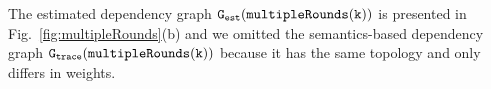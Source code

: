 The estimated dependency graph $\mathtt{{G_{est}}}(\mathtt{multipleRounds(k)})$ is presented in Fig.~\ref{fig:multipleRounds}(b) and we omitted the semantics-based dependency graph $\mathtt{{G_{trace}}}(\mathtt{multipleRounds(k)})$ because it has the same topology and only differs in weights.
%
